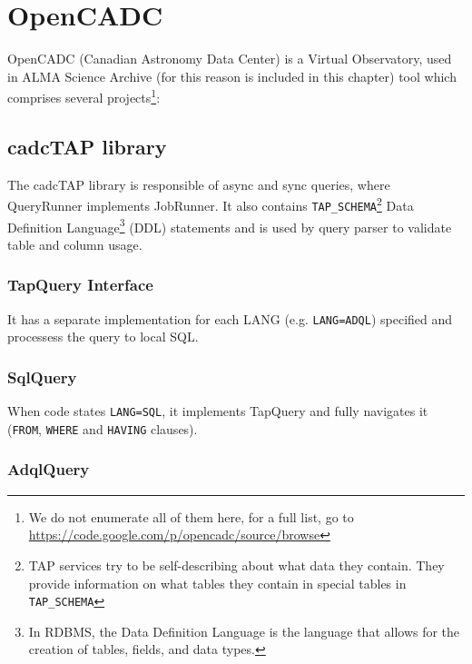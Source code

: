 

\section{OpenCADC} %
\label{sec:opencadc}

OpenCADC (Canadian Astronomy Data Center) is a Virtual Observatory, used in ALMA Science Archive (for this reason is included in this chapter) tool which comprises several projects\footnote{We do not enumerate all of them here, for a full list, go to \url{https://code.google.com/p/opencadc/source/browse}}:



\subsection{cadcTAP library} %
\label{sub:cadctap_library}

The cadcTAP library is responsible of async and sync queries, where QueryRunner implements JobRunner. It also contains \texttt{TAP\_SCHEMA}\footnote{TAP services try to be self-describing about what data they contain. They provide information on what tables they contain in special tables in \texttt{TAP\_SCHEMA}}
Data Definition Language\footnote{In RDBMS, the Data Definition Language is the language that allows for the creation of tables, fields, and data types.} (DDL) %
statements and is used by query parser to validate table and column usage.

\subsubsection{TapQuery Interface}

It has a separate implementation for each LANG (e.g. \texttt{LANG=ADQL}) specified and processess the query to local SQL.

\subsubsection{SqlQuery}

When code states \texttt{LANG=SQL}, it implements TapQuery and fully navigates it (\texttt{FROM}, \texttt{WHERE} and \texttt{HAVING} clauses).

\subsubsection{AdqlQuery}

